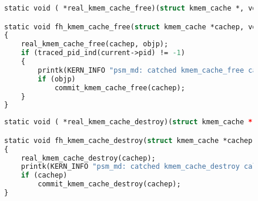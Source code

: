 \begin{figure}[H]
	\begin{lstlisting}[label=fh_kmem_cache_free,caption=Оберточная функция для kmem\_cache\_free,language=Caml]
static void ( *real_kmem_cache_free)(struct kmem_cache *, void *);

static void fh_kmem_cache_free(struct kmem_cache *cachep, void *objp)
{
	real_kmem_cache_free(cachep, objp);
	if (traced_pid_ind(current->pid) != -1)
	{
		printk(KERN_INFO "psm_md: catched kmem_cache_free call from %d\n", current->pid);
		if (objp)
			commit_kmem_cache_free(cachep);
	}
}
	\end{lstlisting}
\end{figure}
\begin{figure}[H]
	\begin{lstlisting}[label=fh_kmem_cache_destroy,caption=Оберточная функция для kmem\_cache\_destroy,language=Caml]
static void ( *real_kmem_cache_destroy)(struct kmem_cache *);

static void fh_kmem_cache_destroy(struct kmem_cache *cachep)
{
	real_kmem_cache_destroy(cachep);
	printk(KERN_INFO "psm_md: catched kmem_cache_destroy call from %d\n", current->pid);
	if (cachep)
		commit_kmem_cache_destroy(cachep);
}
	\end{lstlisting}
\end{figure}

